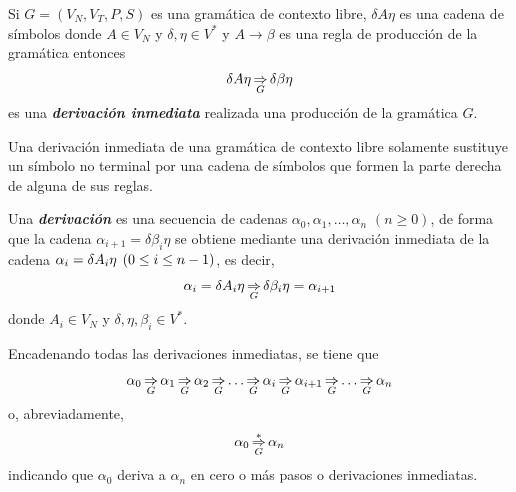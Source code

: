 \begin{definicion}
Si $G = (V_N,V_T,P,S)$ es una gramática de contexto libre, $\delta A \eta$ es una cadena de símbolos donde $A \in V_N$ y $\delta, \eta \in V^*$ y $A \longrightarrow \beta$ es una regla de producción de la gramática entonces
\begin{equation}  
  \delta A \eta \mathop{\Rightarrow}\limits_G \delta \beta \eta 
\end{equation}  
 es una {\bf\em derivación inmediata} realizada una producción de la gramática $G$.
\end{definicion}

Una derivación inmediata de una gramática de contexto libre solamente sustituye un símbolo no terminal por una cadena de símbolos que formen la parte derecha de alguna de sus reglas.

\begin{definicion}
 Una {\bf\em derivación} es una secuencia de cadenas $\alpha_0, \alpha_1, \dots, \alpha_n$ $(n \geq 0)$, de forma que la cadena $\alpha_{i+1} = \delta \beta_i \eta$ se obtiene mediante una derivación inmediata de la cadena $\alpha_i = \delta A_i \eta \hspace{1ex} (0 \leq i \leq n-1)$, es decir,
\begin{equation}
 \alpha_i = \delta  A_i \eta \mathop{\Rightarrow}\limits_G \delta \beta_i \eta = \alpha_{i+1} 
\end{equation}
donde $A_i \in V_N$ y $\delta,\eta,\beta_i \in V^*$.

Encadenando todas las derivaciones inmediatas, se tiene que 
\begin{equation}
 \alpha_0 \mathop{\Rightarrow}\limits_G \alpha_1 \mathop{\Rightarrow}\limits_G \alpha_2 \mathop{\Rightarrow}\limits_G \dots \mathop{\Rightarrow}\limits_G \alpha_i \mathop{\Rightarrow}\limits_G  \alpha_{i+1} \mathop{\Rightarrow}\limits_G  \dots \mathop{\Rightarrow}\limits_G  \alpha_n
\end{equation}
o, abreviadamente,
\begin{equation}
\alpha_0 \mathop{\Rightarrow}\limits^*_G \alpha_n
\end{equation}
 indicando que $\alpha_0$ deriva a $\alpha_n$ en cero o m\'as pasos o derivaciones inmediatas.
\end{definicion}

